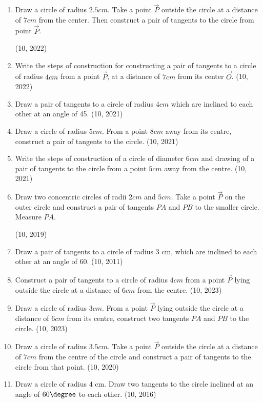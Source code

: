 \begin{enumerate}[label=\thesubsection.\arabic*,ref=\thesubsection.\theenumi]
	\item Draw a circle of radius $2.5 cm$. Take a point $\vec{P}$ outside the circle at a distance of $7 cm$ from the center. Then construct a pair of tangents to the circle from point $\vec{P}$.

\hfill (10, 2022)
	\item Write the steps of construction for constructing a pair of tangents to a circle of radius $4 cm$ from a point $\vec{P}$, at a distance of $7 cm$ from its center $\vec{O}$.
\hfill (10, 2022)
	\item Draw a pair of tangents to a circle of radius $4 cm$ which are inclined to each other at an angle of 45\degree.	
\hfill (10, 2021)
	\item Draw a circle of radius $5 cm$. From a point $8 cm$ away from its centre, construct a pair of tangents to the circle.
\hfill (10, 2021)
	\item Write the steps of construction of a circle of diameter $6 cm$ and drawing of a pair of tangents to the circle from a point $5 cm$ away from the centre.
\hfill (10, 2021)
\item Draw two concentric circles of radii $2 cm$ and $5 cm$. Take a point $\vec{P}$ on the outer circle and construct a pair of tangents $PA$ and $PB$ to the smaller circle. Measure $PA$.  

\hfill (10, 2019)
    \item Draw a pair of tangents to a circle of radius $3$ cm, which are inclined to each other at an angle of 60\degree.
\hfill (10, 2011)
\item Construct a pair of tangents to a circle of radius $4cm$ from a point $\vec{P}$ lying outside the circle at a distance of $6cm$ from the centre.
\hfill (10, 2023)
	\item  Draw a circle of radius $3 cm$. From a point $\vec{P}$ lying outside the 
       circle at a distance of $6cm$ from its centre, construct two tangents
       $PA$ and $PB$ to the circle.
\hfill (10, 2023)
	\item Draw a circle of radius $3.5 cm$. Take a point $\vec{P}$ outside the circle at a distance of $7 cm$ from the centre of the circle and construct a pair of tangents to the circle from that point.
\hfill (10, 2020)
\item Draw a circle of radius $4$ cm. Draw two tangents to the circle inclined at an angle of $ 60 \degree $ to each other.
\hfill (10, 2016)

\end{enumerate}

